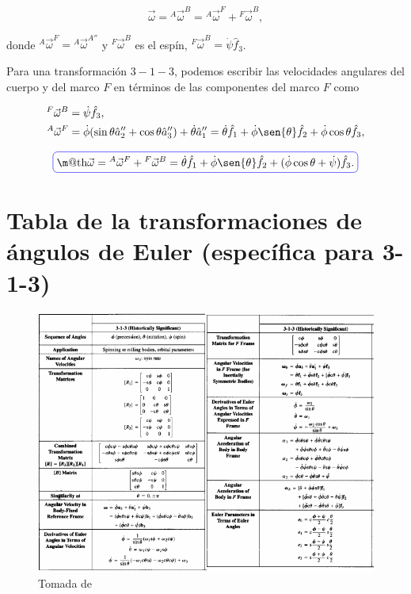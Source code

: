 \documentclass[a4paper,10pt]{article}
\makeatletter
\numberwithin{equation}{section}
\newcommand*{\boxcolor}{blue}
\renewcommand{\boxed}[1]{\textcolor{\boxcolor}{%
\tikz[baseline={([yshift=-1ex]current bounding box.center)}] \node [rectangle, minimum width=1ex,rounded corners,draw] {\normalcolor\m@th$\displaystyle#1$};}}
\makeatother
\begin{document}
\begin{equation}
 \vec{\omega} =  {^A}{ \vec{\omega}}^{B} =  {^A}{ \vec{\omega}}^{F} + 
  {^F}{ \vec{\omega}}^{B},
  \label{eq:velAngFframe2}
\end{equation}

donde ${^A}{ \vec{\omega}}^{F} = {^A}{ \vec{\omega}}^{A''}$ y ${^F}{ \vec{\omega}}^{B}$ 
es el espín, ${^F}{ \vec{\omega}}^{B} = \dot{\psi}\hat{f}_3$. 

\vspace{.cm}

Para una transformación $3-1-3$, podemos escribir las velocidades angulares del cuerpo 
y del marco $F$ en términos de las componentes del marco $F$ como

\begin{align}
\begin{split}
 {^F}{ \vec{\omega}}^{B} &= \dot{\psi}\hat{f}_3, \\
 {^A}{ \vec{\omega}}^{F} &= \dot{\phi}(\sin{\theta}\hat{a}''_2 + \cos{\theta}\hat{a}''_3) 
 + \dot{\theta}\hat{a}''_1 = \dot{\theta}\hat{f}_1 + \dot{\phi}\sen{\theta}\hat{f}_2 +
 \dot{\phi}\cos{\theta}\hat{f}_3,
\end{split}
\end{align}

\begin{equation}
 \boxed{\vec{\omega} = {^A}{ \vec{\omega}}^{F} + {^F}{ \vec{\omega}}^{B} = \dot{\theta}\hat{f}_1 
 + \dot{\phi}\sen{\theta}\hat{f}_2 + (\dot{\phi}\cos{\theta} + \dot{\psi})\hat{f}_3.}
\label{eq:velAngFframe3}
\end{equation}

\newpage

\section{Tabla de la transformaciones de ángulos de Euler (específica para 3-1-3)}

\begin{figure}[H]
 \center
 \includegraphics[scale=0.55]{apendice4fig1}
 \caption{Tomada de \cite{baruh}}
 \label{fig:apendice4fig1}
\end{figure}
\end{document}
